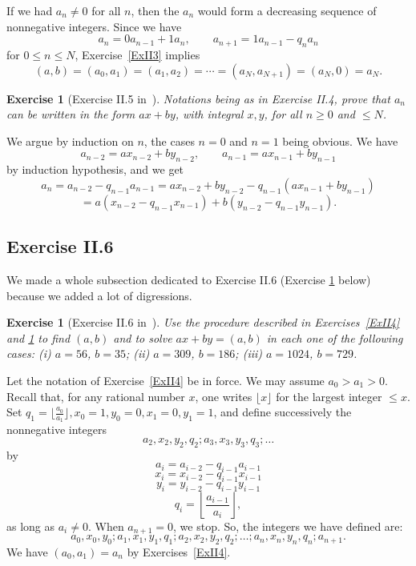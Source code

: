 \documentclass[12pt,letterpaper]{article}
\newtheorem{exer}[thm]{Exercise}
\theoremstyle{definition}
\begin{document}
If we had $a_n\ne0$ for all $n$, then the $a_n$ would form a decreasing sequence of nonnegative integers. Since we have 
\[
a_n=0a_{n-1}+1a_n, \qquad a_{n+1}=1a_{n-1}-q_na_n
\] 
for $0\le n\le N$, Exercise~\ref{ExII3} implies 
$$
(a,b)=(a_0,a_1)=(a_1,a_2)=\cdots=(a_N,a_{N+1})=(a_N,0)=a_N.
$$ 

\begin{exer}[Exercise II.5 in~\cite{weil1979}]\label{ExII5}
Notations being as in Exercise II.4, prove that $a_n$ can be written in the form $ax+by$, with integral $x,y$, for all $n\ge 0$ and $\le N$.
\end{exer} 

We argue by induction on $n$, the cases $n=0$ and $n=1$ being obvious. We have 
$$ 
a_{n-2}=ax_{n-2}+by_{n-2}, \qquad a_{n-1}=ax_{n-1}+by_{n-1}
$$ 
by induction hypothesis, and we get 
$$
a_n=a_{n-2}-q_{n-1}a_{n-1}=ax_{n-2}+by_{n-2}-q_{n-1}(ax_{n-1}+by_{n-1})
$$ 
$$
=a(x_{n-2}-q_{n-1}x_{n-1})+b(y_{n-2}-q_{n-1}y_{n-1}).
$$ 

\subsection{Exercise II.6} %

We made a whole subsection dedicated to Exercise II.6 (Exercise \ref{ExII6} below) because we added a lot of digressions. 

\begin{exer}[Exercise II.6 in~\cite{weil1979}]\label{ExII6}
Use the procedure described in Exercises~\ref{ExII4} and \ref{ExII5} to find $(a,b)$ and to solve $ax+by=(a,b)$ in each one of the following cases: \emph{(i)} $a=56$, $b=35$; \emph{(ii)} $a=309$, $b=186$; \emph{(iii)} $a=1024$, $b=729$.
\end{exer} 

Let the notation of Exercise~\ref{ExII4} be in force. We may assume $a_0>a_1>0$. Recall that, for any rational number $x$, one writes $\lfloor x\rfloor$ for the largest integer $\le x$. Set $q_1=\lfloor\frac{a_0}{a_1}\rfloor, x_0=1, y_0=0, x_1=0, y_1=1$, and define successively the nonnegative integers 
$$
a_2,x_2,y_2,q_2; a_3,x_3,y_3,q_3;\ldots
$$ 
by 
\begin{equation}\label{Eqai}
a_i=a_{i-2}-q_{i-1} a_{i-1}
\end{equation} 
\begin{equation}\label{Eqxi}
x_i=x_{i-2}-q_{i-1} x_{i-1}
\end{equation} 
\begin{equation}\label{Eqyi}
y_i=y_{i-2}-q_{i-1} y_{i-1}
\end{equation} 
\begin{equation}\label{Eqqi}
q_i=\left\lfloor\frac{a_{i-1}}{a_i}\right\rfloor,
\end{equation} 
as long as $a_i\ne0$. When $a_{n+1}=0$, we stop. So, the integers we have defined are: 
\begin{equation}\label{Elist}
a_0,x_0,y_0; a_1,x_1,y_1,q_1; a_2,x_2,y_2,q_2; \ldots ; a_n,x_n,y_n,q_n; a_{n+1}.
\end{equation} 
We have $(a_0,a_1)=a_n$ by Exercises~\ref{ExII4}. 
\end{document}
